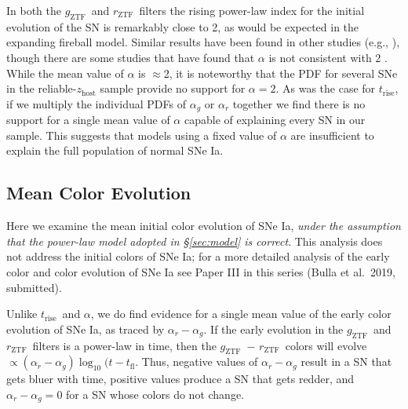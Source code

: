 \documentclass[twocolumn]{./aastex63}
\newcommand{\rztf}{$r_\mathrm{ZTF}$}
\newcommand{\gztf}{$g_\mathrm{ZTF}$}
\newcommand{\trise}{$t_\mathrm{rise}$}
\begin{document}
In both the \gztf\ and \rztf\ filters the rising power-law index for the
initial evolution of the SN is remarkably close to 2, as would be expected in
the expanding fireball model. Similar results have been found in other studies
(e.g., \citealt{Conley06,Hayden10,Ganeshalingam11,Zheng17a}), though there are
some studies that have found that $\alpha$ is not consistent with 2
\citep{Firth15}. While the mean value of $\alpha$ is $\approx$2, it is
noteworthy that the PDF for several SNe in the reliable-$z_\mathrm{host}$
sample provide no support for $\alpha = 2$. As was the case for \trise, if we
multiply the individual PDFs of $\alpha_g$ or $\alpha_r$ together we find
there is no support for a single mean value of $\alpha$ capable of explaining
every SN in our sample. This suggests that models using a fixed value of
$\alpha$ are insufficient to explain the full population of normal SNe Ia.

\subsection{Mean Color Evolution}\label{sec:colors}

Here we examine the mean initial color evolution of SNe Ia, \textit{under the
assumption that the power-law model adopted in \S\ref{sec:model} is correct}.
This analysis does not address the initial colors of SNe Ia; for a more
detailed analysis of the early color and color evolution of SNe Ia see Paper
III in this series (Bulla et al.~2019, submitted).

Unlike \trise\ and $\alpha$, we do find evidence for a single mean value of
the early color evolution of SNe Ia, as traced by $\alpha_r - \alpha_g$. If
the early evolution in the \gztf\ and \rztf\ filters is a power-law in time,
then the \gztf\ $-$ \rztf\ colors will evolve $\propto (\alpha_r - \alpha_g)
\log_{10} (t - t_\mathrm{fl}$. Thus, negative values of $\alpha_r - \alpha_g$
result in a SN that gets bluer with time, positive values produce a SN that
gets redder, and $\alpha_r - \alpha_g = 0$ for a SN whose colors do not change.
\end{document}
